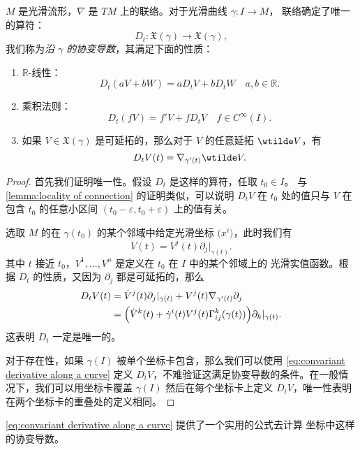 \documentclass[fontset=none]{Notes}
\begin{document}
\begin{theorem}[沿曲线的协变导数]\label{thm:convariant derivative along a curve}
  $M$ 是光滑流形，$\nabla$ 是 $TM$ 上的联络。对于光滑曲线 $\gamma:I\to M$，
  联络确定了唯一的算符：
  \[
    D_t:\mathfrak{X}(\gamma)\to \mathfrak{X}(\gamma),  
  \]
  我们称为\emph{沿 $\gamma$ 的协变导数}，其满足下面的性质：
  \begin{enumerate}
    \item $\mathbb{R}$-线性：
    \[
      D_t(aV+bW)=aD_tV+bD_tW\quad a,b\in \mathbb{R}.  
    \]
    \item 乘积法则：
    \[
      D_t(fV)=f'V+fD_tV\quad f\in C^\infty(I).  
    \]
    \item 如果 $V\in \mathfrak{X}(\gamma)$ 是可延拓的，那么对于 $V$ 的任意延拓 $\wtilde V$，有
    \[
      D_tV(t)=\nabla_{\gamma'(t)}\wtilde V.  
    \]
  \end{enumerate}
\end{theorem}
\begin{proof}
  首先我们证明唯一性。假设 $D_t$ 是这样的算符，任取 $t_0\in I$。
  与 \autoref{lemma:locality of connection} 的证明类似，可以说明 $D_tV$
  在 $t_0$ 处的值只与 $V$ 在包含 $t_0$ 的任意小区间 $(t_0-\varepsilon,t_0+\varepsilon)$
  上的值有关。

  选取 $M$ 的在 $\gamma(t_0)$ 的某个邻域中给定光滑坐标 $\bigl(x^i\bigr)$，此时我们有
  \[
    V(t)=V^j(t)\partial_j|_{\gamma(t)}.  
  \]
  其中 $t$ 接近 $t_0$，$V^1,\dots,V^n$ 是定义在 $t_0$ 在 $I$ 中的某个邻域上的 
  光滑实值函数。根据 $D_t$ 的性质，又因为 $\partial_j$ 都是可延拓的，那么
  \begin{equation}\label{eq:convariant derivative along a curve}
    \begin{aligned}
      D_tV(t)&=\dot V^j(t)\partial_j|_{\gamma(t)}+V^j(t)\nabla_{\gamma'(t)}\partial_j\\
      &=\Bigl(\dot V^k(t)+\dot\gamma^i(t)V^j(t)\Gamma_{ij}^k(\gamma(t))\Bigr)
      \partial_k|_{\gamma(t)}.
    \end{aligned}
  \end{equation}
  这表明 $D_t$ 一定是唯一的。

  对于存在性，如果 $\gamma(I)$ 被单个坐标卡包含，那么我们可以使用 \eqref{eq:convariant derivative along a curve} 
  定义 $D_tV$，不难验证这满足协变导数的条件。在一般情况下，我们可以用坐标卡覆盖 $\gamma(I)$
  然后在每个坐标卡上定义 $D_tV$，唯一性表明在两个坐标卡的重叠处的定义相同。
\end{proof}

\eqref{eq:convariant derivative along a curve} 提供了一个实用的公式去计算
坐标中这样的协变导数。
\end{document}
